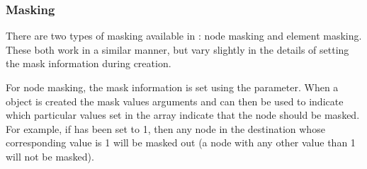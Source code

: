 \documentclass[letterpaper,10pt,english]{sphinxmanual}
\begin{document}
\begin{sphinxVerbatim}[commandchars=\\\{\}]
\PYG{p}{[}         
                              
                              
                          
                   \PYG{p}{]}  


\end{sphinxVerbatim}


\subsubsection{Masking}
\label{\detokenize{api:id1}}
There are two types of masking available in {\hyperref[\detokenize{mesh:ESMF.api.mesh.Mesh}]{}}: node masking and element
masking. These both work in a similar manner, but vary slightly in the details
of setting the mask information during {\hyperref[\detokenize{mesh:ESMF.api.mesh.Mesh}]{}} creation.

For node masking, the mask information is set using the  parameter.
When a {\hyperref[\detokenize{regrid:ESMF.api.regrid.Regrid}]{}} object is created the mask values arguments  and
 can then be used to indicate which particular values set in
the  array indicate that the node should be masked. For example, if
 has been set to 1, then any node in the destination {\hyperref[\detokenize{mesh:ESMF.api.mesh.Mesh}]{}} whose
corresponding  value is 1 will be masked out (a node with any other
value than 1 will not be masked).
\end{document}

